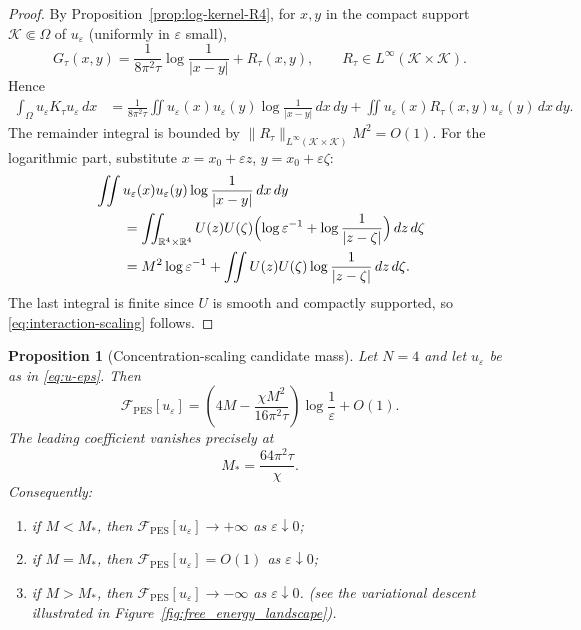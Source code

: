 \documentclass[11pt,reqno]{amsart}
\newtheorem{proposition}[theorem]{Proposition}
\theoremstyle{definition}
\theoremstyle{remark}
\newcommand{\R}{\mathbb{R}}
\newcommand{\Free}{\mathcal{F}}
\begin{document}
\begin{proof}
By Proposition~\ref{prop:log-kernel-R4}, for $x,y$ in the compact support $\mathcal K\Subset\Omega$ of $u_\varepsilon$ (uniformly in $\varepsilon$ small),
\[
        G_\tau(x,y)=\frac{1}{8\pi^{2}\tau}\log\frac{1}{|x-y|}+R_\tau(x,y),
        \qquad
        R_\tau\in L^{\infty}(\mathcal K\times\mathcal K).
\]
Hence
\[
\begin{aligned}
        \int_\Omega u_\varepsilon K_\tau u_\varepsilon\,dx
        &=\frac{1}{8\pi^{2}\tau}\iint u_\varepsilon(x)u_\varepsilon(y)\log\frac{1}{|x-y|}\,dx\,dy
        +\iint u_\varepsilon(x)R_\tau(x,y)u_\varepsilon(y)\,dx\,dy.
\end{aligned}
\]
The remainder integral is bounded by $\|R_\tau\|_{L^{\infty}(\mathcal K\times\mathcal K)}M^{2}=O(1)$. For the logarithmic part, substitute $x=x_0+\varepsilon z$, $y=x_0+\varepsilon\zeta$:
\[
\begin{aligned}
        &\iint u_\varepsilon(x)u_\varepsilon(y)\log\frac{1}{|x-y|}\,dx\,dy\\
        &\qquad=\iint_{\R^{4}\times\R^{4}}U(z)U(\zeta)\Bigl(\log\varepsilon^{-1}+\log\frac{1}{|z-\zeta|}\Bigr)\,dz\,d\zeta\\
        &\qquad=M^{2}\log\varepsilon^{-1}+\iint U(z)U(\zeta)\log\frac{1}{|z-\zeta|}\,dz\,d\zeta.
\end{aligned}
\]
The last integral is finite since $U$ is smooth and compactly supported, so \eqref{eq:interaction-scaling} follows.
\end{proof}

\begin{proposition}[Concentration-scaling candidate mass]\label{prop:candidate-mass}
Let $N=4$ and let $u_\varepsilon$ be as in \eqref{eq:u-eps}. Then
\begin{equation}\label{eq:F-concentration}
        \Free_{\mathrm{PES}}[u_\varepsilon]
        =\left(4M-\frac{\chi M^{2}}{16\pi^{2}\tau}\right)\log\frac{1}{\varepsilon}+O(1).
\end{equation}
The leading coefficient vanishes precisely at
\begin{equation}\label{eq:M-star-final}
        M_{\!*}=\frac{64\pi^{2}\tau}{\chi}.
\end{equation}
Consequently:
\begin{enumerate}[label=(\roman*),leftmargin=2em]
\item if $M<M_{\!*}$, then $\Free_{\mathrm{PES}}[u_\varepsilon]\to +\infty$ as $\varepsilon\downarrow 0$;
\item if $M=M_{\!*}$, then $\Free_{\mathrm{PES}}[u_\varepsilon]=O(1)$ as $\varepsilon\downarrow 0$;
\item if $M>M_{\!*}$, then $\Free_{\mathrm{PES}}[u_\varepsilon]\to -\infty$ as $\varepsilon\downarrow 0$. (see the variational descent illustrated in Figure~\ref{fig:free_energy_landscape}).
\end{enumerate}
\end{proposition}
\end{document}

